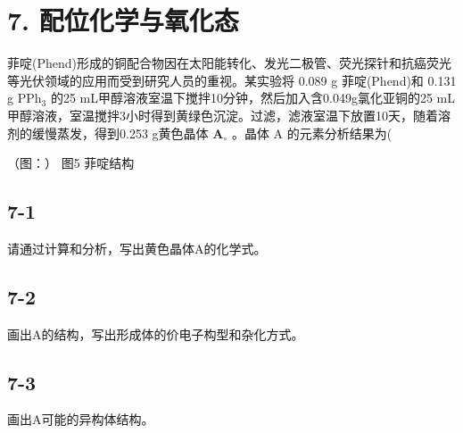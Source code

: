 \section*{7. 配位化学与氧化态}
菲啶(Phend)形成的铜配合物因在太阳能转化、发光⼆极管、荧光探针和抗癌荧光等光伏领域的应⽤⽽受到研究⼈员的重视。某实验将 0.089 g 菲啶(Phend)和 0.131 g $\mathrm { P P h } _ { 3 }$ 的25 mL甲醇溶液室温下搅拌10分钟，然后加⼊含0.049g氯化亚铜的25 mL甲醇溶液，室温搅拌3⼩时得到⻩绿⾊沉淀。过滤，滤液室温下放置10天，随着溶剂的缓慢蒸发，得到0.253 g⻩⾊晶体 $\mathbf { A } _ { \circ }$ 。晶体 A 的元素分析结果为(%

（图：）
图5 菲啶结构

\subsection*{7-1}
请通过计算和分析，写出⻩⾊晶体A的化学式。

\subsection*{7-2}
画出A的结构，写出形成体的价电⼦构型和杂化⽅式。

\subsection*{7-3}
画出A可能的异构体结构。
